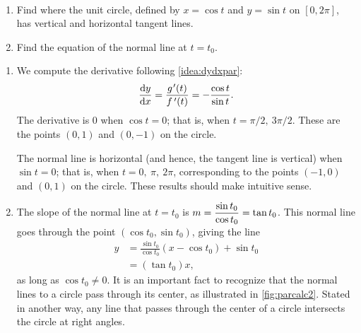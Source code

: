 \begin{example}\label{ex_parcalc2}%
\mbox{}\\[-2\baselineskip]\parbox[t]{\linewidth}{\begin{enumerate}
	\item	Find where the unit circle, defined by $x=\cos t$ and $y=\sin t$ on $[0,2\pi]$, has vertical and horizontal tangent lines. 
	\item	 Find the equation of the normal line at $t=t_0$.
\end{enumerate}}\vspace{0pt}
\solution
\begin{enumerate}
	\item We compute the derivative following \autoref{idea:dydxpar}:
	\[\frac{\dd y}{\dd x} = \frac{g\primeskip'(t)}{\fp(t)} = -\frac{\cos t}{\sin t}.\]
	The derivative is $0$ when $\cos t= 0$; that is, when $t=\pi/2,\ 3\pi/2$. These are the points $(0,1)$ and $(0,-1)$ on the circle.

	The normal line is horizontal (and hence, the tangent line is vertical) when $\sin t=0$; that is, when $t= 0,\ \pi,\ 2\pi$, corresponding to the points $(-1,0)$ and $(0,1)$ on the circle. These results should make intuitive sense.
	\item	The slope of the normal line at $t=t_0$ is $\displaystyle m=\frac{\sin t_0}{\cos t_0} = \tan t_0$. This normal line goes through the point $(\cos t_0,\sin t_0)$, giving the line
%
%
%
\begin{align*}
	y &=\frac{\sin t_0}{\cos t_0}(x-\cos t_0) + \sin t_0\\	
	&= (\tan t_0)x,
\end{align*}
as long as $\cos t_0\neq 0$. It is an important fact to recognize that the normal lines to a circle pass through its center, as illustrated in \autoref{fig:parcalc2}. Stated in another way, any line that passes through the center of a circle intersects the circle at right angles.
\end{enumerate}
\end{example}

